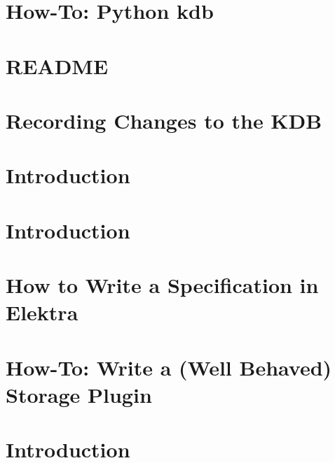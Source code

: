 \let\mypdfximage\pdfximage\def\pdfximage{\immediate\mypdfximage}\documentclass[twoside]{book}
\newcommand{\+}{\discretionary{\mbox{\scriptsize$\hookleftarrow$}}{}{}}
\begin{document}
\chapter{How-\/\+To\+: Python kdb}
\label{doc_tutorials_python-kdb_md}

\chapter{README}
\label{md_doc_tutorials_README}

\chapter{Recording Changes to the KDB}
\label{doc_tutorials_recording_md}

\chapter{Introduction}
\label{doc_tutorials_run_all_tests_with_docker_md}

\chapter{Introduction}
\label{doc_tutorials_run_reformatting_script_with_docker_md}

\chapter{How to Write a Specification in Elektra}
\label{doc_tutorials_specification_md}

\chapter{How-\/\+To\+: Write a (Well Behaved) Storage Plugin}
\label{doc_tutorials_storage-plugins_md}

\chapter{Introduction}
\label{doc_tutorials_using_podman_instead_of_docker_md}

\end{document}
